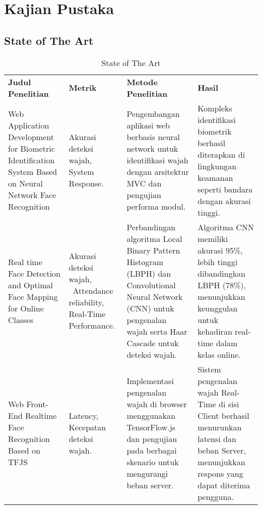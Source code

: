 \chapter{Kajian Pustaka}

\section{State of The Art}

\vspace{-1cm}
\begin{longtable}[t]
  {@{}
    |>{\raggedright\arraybackslash}p{}
    |>{\raggedright\arraybackslash}p{}
    |>{\raggedright\arraybackslash}p{}
    |>{\raggedright\arraybackslash}p{}|
  @{}}
  \endhead
  \endlastfoot

  \caption{State of The Art} \\

  \hline
  \textbf{Judul Penelitian} &
  \textbf{Metrik} &
  \textbf{Metode Penelitian} &
  \textbf{Hasil}

  \\ \hline
  {Web Application Development for Biometric Identification System Based on Neural Network Face Recognition \parencite{bykovWebApplicationDevelopment2020}} &
  {Akurasi deteksi wajah, System Response.} &
  {Pengembangan aplikasi web berbasis neural network untuk identifikasi wajah dengan arsitektur MVC dan pengujian performa modul.} &
  {Kompleks identifikasi biometrik berhasil diterapkan di lingkungan keamanan seperti bandara dengan akurasi tinggi.}


  \\ \hline
  {Real time Face Detection and Optimal Face Mapping for Online Classes \parencite{archanaRealTimeFace2022}} &
  {Akurasi deteksi wajah, ~Attendance reliability, Real-Time Performance.} &
  {Perbandingan algoritma Local Binary Pattern Histogram (LBPH) dan Convolutional Neural Network (CNN) untuk pengenalan wajah serta Haar Cascade untuk deteksi wajah.} &
  {Algoritma CNN memiliki akurasi 95\%, lebih tinggi dibandingkan LBPH (78\%), menunjukkan keunggulan untuk kehadiran real-time dalam kelas online.}

  \\ \hline
  {Web Front-End Realtime Face Recognition Based on TFJS \parencite{liWebFrontEndRealtime2019}} &
  {Latency, Kecepatan deteksi wajah.} &
  {Implementasi pengenalan wajah di browser menggunakan TensorFlow.js dan pengujian pada berbagai skenario untuk mengurangi beban server.} &
  {Sistem pengenalan wajah Real-Time di sisi Client berhasil menurunkan latensi dan beban Server, menunjukkan respons yang dapat diterima pengguna.}


\end{longtable}
